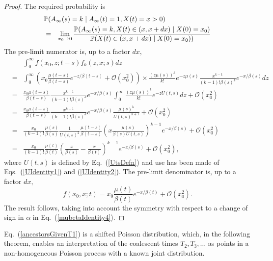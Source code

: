 \documentclass[preprint,12pt]{elsarticle}
\begin{document}
\begin{proof}
The required probability is 
\begin{eqnarray*}
\lefteqn{\mathbb{P}(A_\infty(s) = k \mid A_\infty(t) = 1, X(t) = x > 0)} \nonumber \\
	& = & \lim_{x_0 \to 0} \frac{\mathbb{P}(A_\infty(s) = k, X(t) \in (x, x + dx) \mid X(0) = x_0)}
							{\mathbb{P}(X(t) \in (x, x + dx) \mid X(0) = x_0))}  \nonumber \\
\end{eqnarray*}
The pre-limit numerator is, up to a factor $dx$, 
\begin{eqnarray*}
	& & \int_0^\infty f(x_0, z; t - s) f_k(z, x; s) dz \nonumber \\ 
	& = & \int_0^\infty \left(x_0  \frac{\mu(t - s)}{\beta(t - s)} e^{-z/\beta(t - s)} + \mathcal{O}(x_0^2)\right) \times 
										\frac{(z\mu(s))^k}{k!} e^{-z\mu(s)}\frac{x^{k - 1}}{(k - 1)! \beta(s)^k} e^{-x/\beta(s)} dz \nonumber \\
	& = & \frac{x_0 \mu(t - s)}{\beta(t - s)} \frac{x^{k - 1}}{(k - 1)! \beta(s)^k} e^{-x/\beta(s)} \int_0^\infty \frac{(z\mu(s))^k}{k!} e^{-zU(t, s)} dz + \mathcal{O}(x_0^2) \nonumber \\
	& = & \frac{x_0 \mu(t - s)}{\beta(t - s)} \frac{x^{k - 1}}{(k - 1)! \beta(s)^k} e^{-x/\beta(s)} \frac{\mu(s)^k}{U(t, s)^{k + 1}} + \mathcal{O}(x_0^2) \\
	& = & \frac{x_0}{(k - 1)!} \frac{\mu(s)}{\beta(s)}\frac{1}{U(t, s)^2}\frac{\mu(t - s)}{\beta(t - s)} 
										\left(x\frac{\mu(s)}{\beta(s)U(t, s)}\right)^{k - 1} e^{-x/\beta(s)} + \mathcal{O}(x_0^2) \nonumber\\
	& = & \frac{x_0}{(k - 1)!} \frac{\mu(t)}{\beta(t)}\left(\frac{x}{\beta(s)} - \frac{x}{\beta(t)}\right)^{k - 1}  e^{-x/\beta(s)} + \mathcal{O}(x_0^2), 
\end{eqnarray*}
where $U(t, s)$ is defined by Eq.~(\ref{UtsDefn}) and use has been made of Eqs.~(\ref{UIdentity1}) and (\ref{UIdentity2}).  The pre-limit denominator is, up to a factor $dx$,   
\[
f(x_0, x; t) = x_0  \frac{\mu(t)}{\beta(t)} e^{-x/\beta(t)} + \mathcal{O}(x_0^2).  
\]
The result follows, taking into account the symmetry with respect to a change of sign in $\alpha$ in Eq.~(\ref{mubetaIdentity4}).  
\end{proof}

Eq.~(\ref{ancestorsGivenT1}) is a shifted Poisson distribution, which, in the following theorem, enables an interpretation of the 
coalescent times $T_2, T_3, \ldots$ as points in a non-homogeneous Poisson process with a known joint distribution.  
\end{document}
